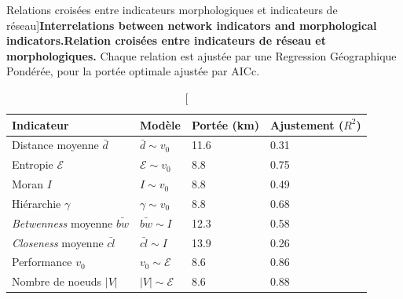 \begin{table}
\caption[Interrelations between network indicators and morphological indicators][Relations croisées entre indicateurs morphologiques et indicateurs de réseau]{\textbf{Interrelations between network indicators and morphological indicators.}\label{tab:staticcorrelations:gwr}}{\textbf{Relation croisées entre indicateurs de réseau et morphologiques.} Chaque relation est ajustée par une Regression Géographique Pondérée, pour la portée optimale ajustée par AICc.\label{tab:staticcorrelations:gwr}}
\begin{tabular}{|l|l|l|l|}
\hline
Indicateur & Modèle & Portée (km) & Ajustement ($R^2$) \\ \hline
Distance moyenne $\bar{d}$ & $\bar{d} \sim v_0$ & 11.6 & 0.31 \\
Entropie $\mathcal{E}$  & $\mathcal{E} \sim v_0$ &  8.8  &0.75 \\
Moran $I$ & $I \sim v_0$ & 8.8 & 0.49 \\
Hiérarchie $\gamma$ & $\gamma \sim v_0$ & 8.8  & 0.68 \\\hline
\emph{Betwenness} moyenne $\bar{bw}$ & $\bar{bw} \sim I$ & 12.3 & 0.58 \\
\emph{Closeness} moyenne $\bar{cl}$ & $\bar{cl}\sim I$ & 13.9 & 0.26 \\
Performance $v_0$ & $v_0 \sim \mathcal{E}$ & 8.6  & 0.86 \\
Nombre de noeuds $\left|V\right|$ & $\left|V\right| \sim \mathcal{E}$ & 8.6  & 0.88 \\\hline
\end{tabular}
\end{table}







